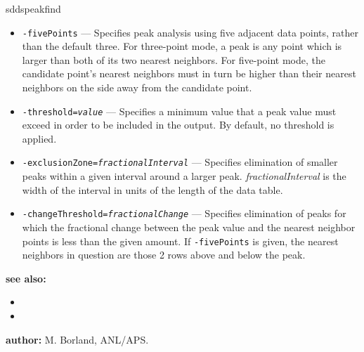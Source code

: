 \begin{sddsprog}{sddspeakfind}
\begin{itemize}
      \item \verb|-fivePoints| --- Specifies peak analysis using five adjacent data points, rather than
        the default three.  For three-point mode, a peak is any point which is larger than both of
        its two nearest neighbors.  For five-point mode, the candidate point's nearest neighbors must in turn
        be higher than their nearest neighbors on the side away from the candidate point.
      \item {\tt -threshold={\em value}} --- Specifies a minimum value that a peak value must exceed in order
        to be included in the output.  By default, no threshold is applied.
      \item {\tt -exclusionZone={\em fractionalInterval}} --- Specifies elimination of smaller peaks within a given interval
        around a larger peak.  {\em fractionalInterval} is the width of the interval in units of the length of the data table.
      \item {\tt -changeThreshold={\em fractionalChange}} --- Specifies elimination of peaks for which the fractional
        change between the peak value and the nearest neighbor points is less than the given amount.  If
        \verb|-fivePoints| is given, the nearest neighbors in question are those 2 rows above and below the
        peak.
    \end{itemize}
  \item \textbf{see also:}
    \begin{itemize}
      \item {}
      \item {}
    \end{itemize}
  \item \textbf{author:} M. Borland, ANL/APS.
\end{sddsprog}

